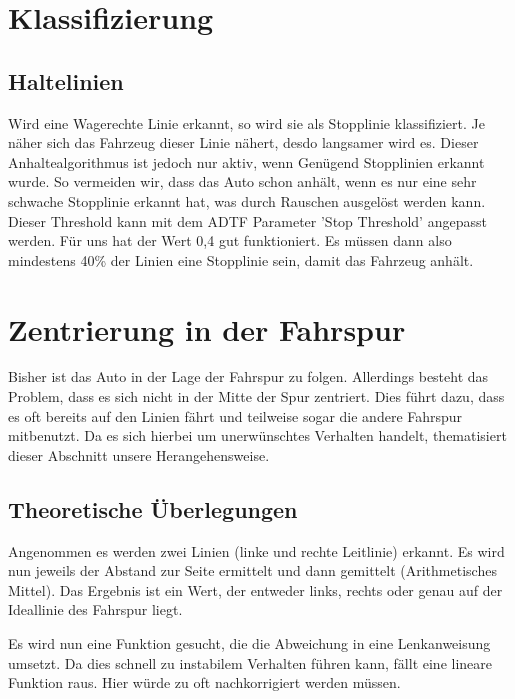 \documentclass[a4paper,12pt]{report}
\begin{document}
\section{Klassifizierung}

\subsection{Haltelinien}
	
	Wird eine Wagerechte Linie erkannt, so wird sie als Stopplinie klassifiziert. Je näher sich das Fahrzeug dieser Linie nähert, desdo langsamer wird es. Dieser Anhaltealgorithmus ist jedoch nur aktiv, wenn Genügend Stopplinien erkannt wurde. So vermeiden wir, dass das Auto schon anhält, wenn es nur eine sehr schwache Stopplinie erkannt hat, was durch Rauschen ausgelöst werden kann. Dieser Threshold kann mit dem ADTF Parameter 'Stop Threshold' angepasst werden. Für uns hat der Wert 0,4 gut funktioniert. Es müssen dann also mindestens 40\% der Linien eine Stopplinie sein, damit das Fahrzeug anhält. 

\section{Zentrierung in der Fahrspur}

	Bisher ist das Auto in der Lage der Fahrspur zu folgen.
	Allerdings besteht das Problem, dass es sich nicht in der Mitte der Spur zentriert.
	Dies führt dazu, dass es oft bereits auf den Linien fährt und teilweise sogar die andere Fahrspur mitbenutzt.
	Da es sich hierbei um unerwünschtes Verhalten handelt, thematisiert dieser Abschnitt unsere Herangehensweise.

\subsection{Theoretische Überlegungen}

	Angenommen es werden zwei Linien (linke und rechte Leitlinie) erkannt.
	Es wird nun jeweils der Abstand zur Seite ermittelt und dann gemittelt (Arithmetisches Mittel).
	Das Ergebnis ist ein Wert, der entweder links, rechts oder genau auf der Ideallinie des Fahrspur liegt.

	Es wird nun eine Funktion gesucht, die die Abweichung in eine Lenkanweisung umsetzt.
	Da dies schnell zu instabilem Verhalten führen kann, fällt eine lineare Funktion raus.
	Hier würde zu oft nachkorrigiert werden müssen.
\end{document}
